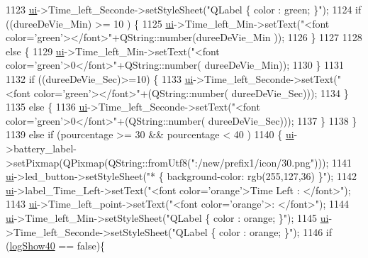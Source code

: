 \begin{DoxyCode}
{1123               \hyperlink{a00008_a6dc041ef6a2ffb329928d2913e8344e6}{ui}->Time\_left\_Seconde->setStyleSheet(\textcolor{stringliteral}{"QLabel \{ color : green; \}"});
1124               \textcolor{keywordflow}{if} ((dureeDeVie\_Min) >=  10 ) \{
1125                   \hyperlink{a00008_a6dc041ef6a2ffb329928d2913e8344e6}{ui}->Time\_left\_Min->setText(\textcolor{stringliteral}{"<font color='green'></font>"}+QString::number(dureeDeVie\_Min
      ));
1126               \}
1127 
1128               \textcolor{keywordflow}{else} \{
1129                   \hyperlink{a00008_a6dc041ef6a2ffb329928d2913e8344e6}{ui}->Time\_left\_Min->setText(\textcolor{stringliteral}{"<font color='green'>0</font>"}+QString::number(
      dureeDeVie\_Min));
1130               \}
1131 
1132               \textcolor{keywordflow}{if} ((dureeDeVie\_Sec)>=10) \{
1133                   \hyperlink{a00008_a6dc041ef6a2ffb329928d2913e8344e6}{ui}->Time\_left\_Seconde->setText(\textcolor{stringliteral}{"<font color='green'></font>"}+(QString::number(
      dureeDeVie\_Sec)));
1134               \}
1135               \textcolor{keywordflow}{else} \{
1136                   \hyperlink{a00008_a6dc041ef6a2ffb329928d2913e8344e6}{ui}->Time\_left\_Seconde->setText(\textcolor{stringliteral}{"<font color='green'>0</font>"}+(QString::number(
      dureeDeVie\_Sec)));
1137               \}
1138          \}
1139           \textcolor{keywordflow}{else} \textcolor{keywordflow}{if} (pourcentage >= 30 && pourcentage < 40 )
1140           \{   \hyperlink{a00008_a6dc041ef6a2ffb329928d2913e8344e6}{ui}->battery\_label->setPixmap(QPixmap(QString::fromUtf8(\textcolor{stringliteral}{":/new/prefix1/icon/30.png"})));
1141               \hyperlink{a00008_a6dc041ef6a2ffb329928d2913e8344e6}{ui}->led\_button->setStyleSheet(\textcolor{stringliteral}{"* \{ background-color: rgb(255,127,36) \}"});
1142               \hyperlink{a00008_a6dc041ef6a2ffb329928d2913e8344e6}{ui}->label\_Time\_Left->setText(\textcolor{stringliteral}{"<font color='orange'>Time Left : </font>"});
1143               \hyperlink{a00008_a6dc041ef6a2ffb329928d2913e8344e6}{ui}->Time\_left\_point->setText(\textcolor{stringliteral}{"<font color='orange'>: </font>"});
1144               \hyperlink{a00008_a6dc041ef6a2ffb329928d2913e8344e6}{ui}->Time\_left\_Min->setStyleSheet(\textcolor{stringliteral}{"QLabel \{ color : orange; \}"});
1145               \hyperlink{a00008_a6dc041ef6a2ffb329928d2913e8344e6}{ui}->Time\_left\_Seconde->setStyleSheet(\textcolor{stringliteral}{"QLabel \{ color : orange; \}"});
1146                 \textcolor{keywordflow}{if} (\hyperlink{a00008_a69c10d3146f1a21e3a2291d272872b3e}{logShow40} == \textcolor{keyword}{false})\{
}
\end{DoxyCode}
